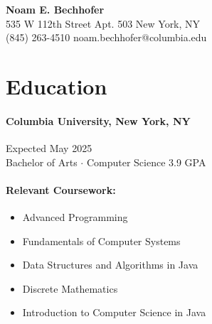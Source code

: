\documentclass[12pt]{article}
\begin{document}
\pagestyle{fancy}
\fancyhf{} %
\renewcommand{\headrulewidth}{0pt} %


\begin{center}
    \begin{Large}
        \textbf{Noam E. Bechhofer}
        \\
        535 W 112th Street \quad Apt. 503 \quad New York, NY
        \\
        (845) 263-4510 \quad noam.bechhofer@columbia.edu
    \end{Large}
\end{center}


\vfill
\section*{Education}

\paragraph*{Columbia University, New York, NY} \hfill Expected May 2025
\\
Bachelor of Arts $\cdot$ Computer Science \hfill 3.9 GPA

\paragraph*{Relevant Coursework: }
\begin{itemize}
    \item Advanced Programming
    \item Fundamentals of Computer Systems
    \item Data Structures and Algorithms in Java
    \item Discrete Mathematics
    \item Introduction to Computer Science in Java
\end{itemize}
\end{document}
